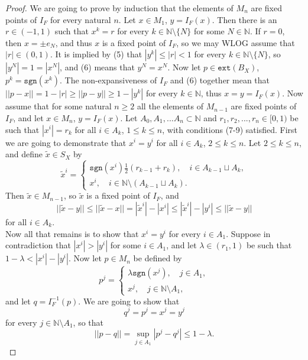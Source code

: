 \documentclass[10pt,a4paper]{amsart}
\newcommand{\N}{\mathbb N}
\begin{document}
\begin{proof}
    We are going to prove by induction that the elements of $M_n$ are fixed points of $I_F$ for every natural $n$.
    Let $x \in M_1$, $y = I_F(x)$. Then there is an $r \in (-1,1)$ such that $x^k=r$ for every $k\in \N \setminus \{N\}$ for some $N \in \N$. If $r=0$, then $x=\pm e_N$, and thus $x$ is a fixed point of $I_F$, so we may WLOG assume that $|r|\in (0,1)$. It is implied by (5) that $|y^k|\leq |r|<1$ for every $k \in \N \setminus \{N\}$, so $|y^N|=1=|x^N|$, and (6) means that $y^N=x^N$. Now let $p\in \mathtt{ext}(B_X)$, $p^k=\mathtt{sgn}(x^k)$. The non-expansiveness of $I_F$ and (6) together mean that $||p-x||=1-|r|\geq ||p-y||\geq 1-|y^k|$ for every $k \in \N$, thus $x=y=I_F(x)$.
    Now assume that for some natural $n \geq 2$ all the elements of $M_{n-1}$ are fixed points of $I_F$, and let $x \in M_{n}$, $y=I_F(x)$. Let $A_0,A_1,...A_n\subset \N$ and $r_1,r_2,...,r_n\in [0, 1)$ be such that $|x^i|=r_k$ for all $i \in A_k$, $1 \leq k \leq n$, with conditions (7-9) satisfied. First we are going to demonstrate that $x^i=y^i$ for all $i\in A_k$, $2 \leq k \leq n$. Let $2 \leq k \leq n$, and define $\tilde{x} \in S_X$ by 
     \[\tilde{x}^i=\begin{cases} \mathtt{sgn}(x^i) \frac12  (r_{k-1}+r_k), \quad i \in A_{k-1} \sqcup A_k,\\
    x^i, \quad i \in \N \setminus (A_{k-1} \sqcup A_k).
    \end{cases}\]
    Then $\tilde{x}\in M_{n-1}$, so $\tilde{x}$ is a fixed point of $I_F$, and \[||\tilde{x}-y|| \leq ||\tilde{x}-x||=|\tilde{x}^i|-|x^i|\leq |\tilde{x}^i|-|y^i| \leq ||\tilde{x}-y||\]
    for all $i \in A_k$.\\
    Now all that remains is to show that $x^i=y^i$ for every $i \in A_1$. 
    Suppose in contradiction that $|x^i|>|y^i|$ for some $i \in A_1$, and let $\lambda \in (r_1,1)$ be such that $1-\lambda <|x^i|-|y^i|$. Now let $p \in M_n$ be defined by
    \[p^j=\begin{cases} \lambda \mathtt{sgn}(x^j) , \quad j \in A_1,\\
    x^j, \quad j \in \N \setminus A_1,
    \end{cases}\]
    and let $q=I_F^{-1}(p)$.
    We are going to show that
   \begin{equation}\label{eqns}
       q^j=p^j=x^j=y^j
   \end{equation} 
    for every $j \in \N \setminus A_1$, so that 
    \begin{equation*}
        ||p-q||=\sup_{j\in A_1} |p^j-q^j|\leq 1-\lambda.

\end{equation*}
\end{proof}
\end{document}
